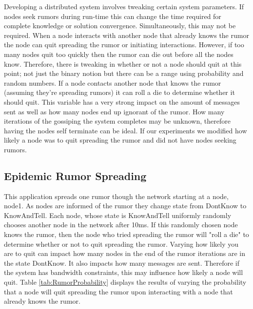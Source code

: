 \documentclass[11pt,twocolumn]{article}
\begin{document}
Developing a distributed system involves tweaking certain system parameters.  If nodes seek rumors during run-time this can change the time required for complete knowledge or solution convergence.  Simultaneously, this may not be required.  When a node interacts with another node that already knows the rumor the node can quit spreading the rumor or initiating interactions.  However, if too many nodes quit too quickly then the rumor can die out before all the nodes know.  Therefore, there is tweaking in whether or not a node should quit at this point; not just the binary notion but there can be a range using probability and random numbers.  If a node contacts another node that knows the rumor (assuming they're spreading rumors) it can roll a die to determine whether it should quit.  This variable has a very strong impact on the amount of messages sent as well as how many nodes end up ignorant of the rumor.  How many iterations of the gossiping the system completes may be unknown, therefore having the nodes self terminate can be ideal.  If our experiments we modified how likely a node was to quit spreading the rumor and did not have nodes seeking rumors.

\subsection{Epidemic Rumor Spreading}

This application spreads one rumor though the network starting at a node, node1.  As nodes are informed of the rumor they change state from DontKnow to KnowAndTell.  Each node, whose state is KnowAndTell uniformly randomly chooses another node in the network after 10ms.  If this randomly chosen node knows the rumor, then the node who tried spreading the rumor will "roll a die" to determine whether or not to quit spreading the rumor.  Varying how likely you are to quit can impact how many nodes in the end of the rumor iterations are in the state DontKnow.  It also impacts how many messages are sent.  Therefore if the system has bandwidth constraints, this may influence how likely a node will quit.  Table \ref{tab:RumorProbability} displays the results of varying the probability that a node will quit spreading the rumor upon interacting with a node that already knows the rumor.
\end{document}
